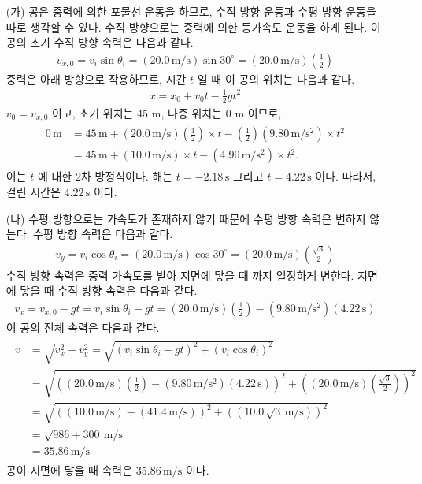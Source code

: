 \documentclass[floatfix,nofootinbib,superscriptaddress,fleqn,preprint]{revtex4}
\begin{document}
\begin{itemize}
  \item[(가)]공은 중력에 의한 포물선 운동을 하므로, 수직 방향 운동과
  수평 방향 운동을 따로 생각할 수 있다. 수직 방향으로는 중력에 의한 등가속도 운동을 하게 된다.
  이 공의 초기 수직 방향 속력은 다음과 같다.
  \begin{align}
    v_{x,0}=v_i\sin{\theta_i}=(20.0\,\mathrm{m/s})\sin{30^\circ}
    =(20.0\,\mathrm{m/s})\left(\frac{1}{2}\right)
  \end{align}
  중력은 아래 방향으로 작용하므로,
  시간 $t$ 일 때 이 공의 위치는 다음과 같다.
  \begin{align}
    x=x_0+v_0t-\frac{1}{2}gt^2
  \end{align}
  $v_0=v_{x,0}$ 이고, 초기 위치는 45 m, 나중 위치는 0 m 이므로,
  \begin{align}
    \begin{split} 
      0\,\mathrm{m}&=45\,\mathrm{m}+(20.0\,\mathrm{m/s})
      \left(\frac{1}{2}\right)\times t
      -\left(\frac{1}{2}\right)
      (9.80\,\mathrm{m/s^2})\times t^2 \\
      &=45\,\mathrm{m}+(10.0\,\mathrm{m/s})\times t
      -(4.90\,\mathrm{m/s^2})\times t^2.
    \end{split}
  \end{align}
  이는 $t$ 에 대한 2차 방정식이다. 해는 $t=-2.18\,\mathrm{s} $ 
  그리고 $t=4.22\,\mathrm{s}$ 이다. 
  따라서, 걸린 시간은 $4.22\,\mathrm{s}$ 이다.
  \item[(나)] 
  수평 방향으로는 가속도가 존재하지 않기 때문에 수평 방향 속력은 
  변하지 않는다. 수평 방향 속력은 다음과 같다.
  \begin{align}
    v_y=v_i\cos{\theta_i}=(20.0\,\mathrm{m/s})\cos{30^\circ}
    =(20.0\,\mathrm{m/s})\left(\frac{\sqrt{3}}{2}\right)
  \end{align}
  수직 방향 속력은 중력 가속도를 받아 지면에 닿을 때 까지 일정하게 변한다. 
  지면에 닿을 때 수직 방향 속력은 다음과 같다.
  \begin{align}
    v_x=v_{x,0}-gt=v_i\sin{\theta_i}-gt
    =(20.0\,\mathrm{m/s})\left(\frac{1}{2}\right)
    -(9.80\,\mathrm{m/s^2})(4.22\,\mathrm{s})
  \end{align}
  이 공의 전체 속력은 다음과 같다.
  \begin{align}
    \begin{split}
      v&=\sqrt{v_x^2+v_y^2}=\sqrt{{(v_i\sin{\theta_i}-gt)}^2+{(v_i\cos{\theta_i})}^2} \\
      &=\sqrt{{\left((20.0\,\mathrm{m/s})\left(\frac{1}{2}\right)
      -(9.80\,\mathrm{m/s^2})(4.22\,\mathrm{s})\right)}^2
      +{\left((20.0\,\mathrm{m/s})\left(\frac{\sqrt{3}}{2}\right)\right)}^2}  \\
      &=\sqrt{{\left((10.0\,\mathrm{m/s})
      -(41.4\,\mathrm{m/s})\right)}^2
      +{\left((10.0\,\sqrt{3}\,\mathrm{m/s})\right)}^2} \\
      &=\sqrt{986+300}\,\mathrm{m/s}\\
      &=35.86\,\mathrm{m/s}
    \end{split}
  \end{align}
  공이 지면에 닿을 때 속력은 $35.86\,\mathrm{m/s}$ 이다.
\end{itemize}
\end{document}
